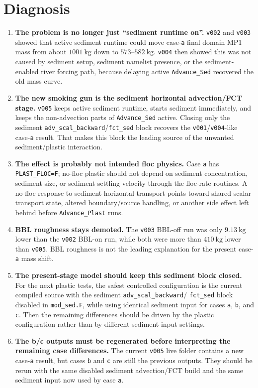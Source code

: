 \documentclass[11pt]{article}
\begin{document}
\section*{Diagnosis}
\begin{enumerate}
\item \textbf{The problem is no longer just ``sediment runtime on''.}
\texttt{v002} and \texttt{v003} showed that active sediment runtime could move
case-\texttt{a} final domain MP1 mass from about \(1001~\mathrm{kg}\) down to
\(573\)--\(582~\mathrm{kg}\).  \texttt{v004} then showed this was not caused by
sediment setup, sediment namelist presence, or the sediment-enabled river
forcing path, because delaying active \texttt{Advance\_Sed} recovered the old
mass curve.

\item \textbf{The new smoking gun is the sediment horizontal
advection/FCT stage.} \texttt{v005} keeps active sediment runtime, starts
sediment immediately, and keeps the non-advection parts of
\texttt{Advance\_Sed} active.  Closing only the sediment
\texttt{adv\_scal\_backward}/\texttt{fct\_sed} block recovers the
\texttt{v001}/\texttt{v004}-like case-\texttt{a} result.  That makes this block
the leading source of the unwanted sediment/plastic interaction.

\item \textbf{The effect is probably not intended floc physics.} Case
\texttt{a} has \texttt{PLAST\_FLOC=F}; no-floc plastic should not depend on
sediment concentration, sediment size, or sediment settling velocity through the
floc-rate routines.  A no-floc response to sediment horizontal transport points
toward shared scalar-transport state, altered boundary/source handling, or
another side effect left behind before \texttt{Advance\_Plast} runs.

\item \textbf{BBL roughness stays demoted.} The \texttt{v003} BBL-off run was
only \(9.13~\mathrm{kg}\) lower than the \texttt{v002} BBL-on run, while both
were more than \(410~\mathrm{kg}\) lower than \texttt{v005}.  BBL roughness is
not the leading explanation for the present case-\texttt{a} mass shift.

\item \textbf{The present-stage model should keep this sediment block closed.}
For the next plastic tests, the safest controlled configuration is the current
compiled source with the sediment \texttt{adv\_scal\_backward}/
\texttt{fct\_sed} block disabled in \texttt{mod\_sed.F}, while using identical
sediment input for cases \texttt{a}, \texttt{b}, and \texttt{c}.  Then the
remaining differences should be driven by the plastic configuration rather than
by different sediment input settings.

\item \textbf{The b/c outputs must be regenerated before interpreting the
remaining case differences.} The current \texttt{v005} live folder contains a
new case-\texttt{a} result, but cases \texttt{b} and \texttt{c} are still the
previous outputs.  They should be rerun with the same disabled sediment
advection/FCT build and the same sediment input now used by case \texttt{a}.
\end{enumerate}
\end{document}
